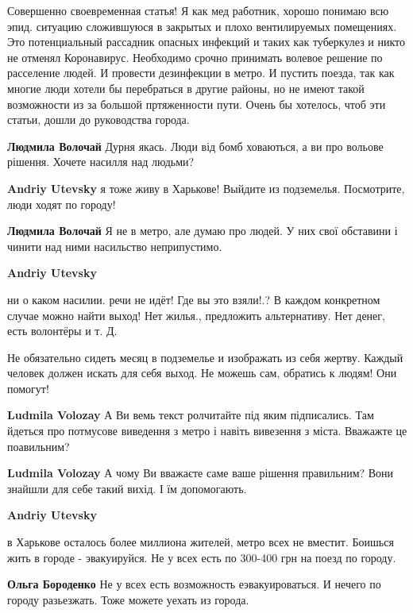 \begin{itemize}

Совершенно своевременная статья! Я как мед работник, хорошо понимаю всю эпид.
ситуацию сложившуюся в закрытых и плохо вентилируемых помещениях. Это
потенциальный рассадник опасных инфекций и таких как туберкулез и никто не
отменял Коронавирус. Необходимо срочно принимать волевое решение по расселение
людей. И провести дезинфекции в метро. И пустить поезда, так как многие люди
хотели бы перебраться в другие районы, но не имеют такой возможности из за
большой пртяженности пути. Очень бы хотелось, чтоб эти статьи, дошли до
руководства города.

\begin{itemize} %
\textbf{Людмила Волочай} Дурня якась. Люди від бомб ховаються, а ви про вольове рішення. Хочете насилля над людьми?

\textbf{Andriy Utevsky} я тоже живу в Харькове! Выйдите из подземелья. Посмотрите, люди ходят по городу!

\textbf{Людмила Волочай} Я не в метро, але думаю про людей. У них свої обставини і чинити над ними насильство неприпустимо.

\textbf{Andriy Utevsky} 

ни о каком насилии. речи не идёт! Где вы это взяли!.? В каждом конкретном
случае можно найти выход! Нет жилья., предложить альтернативу. Нет денег, есть
волонтёры и т. Д.


Не обязательно сидеть месяц в подземелье и изображать из себя жертву. Каждый
человек должен искать для себя выход. Не можешь сам, обратись к людям! Они
помогут!

\textbf{Ludmila Volozay} А Ви вемь текст ролчитайте під яким підписались. Там йдеться про потмусове виведення з метро і навіть вивезення з міста. Вважажте це поавильним?

\textbf{Ludmila Volozay} А чому Ви вважаєте саме ваше рішення правильним? Вони знайшли для себе такий вихід. І їм допомогають.

\textbf{Andriy Utevsky} 

в Харькове осталось более миллиона жителей, метро всех не вместит. Боишься жить
в городе - эвакуируйся. Не у всех есть по 300-400 грн на поезд по городу.

\textbf{Ольга Бороденко} Не у всех есть возможность еэвакуироваться. И нечего по городу разьезжать. Тоже можете уехать из города.


\end{itemize}
\end{itemize}
